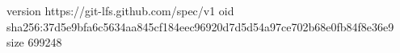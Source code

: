 version https://git-lfs.github.com/spec/v1
oid sha256:37d5e9bfa6c5634aa845cf184eec96920d7d5d54a97ce702b68e0fb84f8e36e9
size 699248
